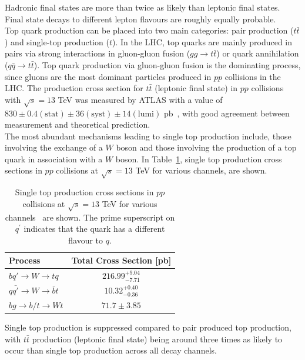 \noindent
Hadronic final states are more than twice as likely than leptonic final states. Final state decays to different lepton flavours are roughly equally probable.\\
Top quark production can be placed into two main categories: pair production ($t\bar{t}$) and single-top production ($t$). In the LHC, top quarks are mainly produced in pairs via strong interactions in gluon-gluon fusion ($gg\rightarrow t\bar{t}$) or quark annihilation ($q\bar{q}\rightarrow t\bar{t}$). Top quark production via gluon-gluon fusion is the dominating process, since gluons are the most dominant particles produced in $pp$ collisions in the LHC. The production cross section for $t\bar{t}$ (leptonic final state) in $pp$ collisions with $\sqrt{s} = 13$ TeV was measured by ATLAS with a value of $830 \pm 0.4 (\text{stat}) \pm 36 (\text{syst}) \pm 14 (\text{lumi})$ pb~\cite{ATLAS-tt-crossSection-2020}, with good agreement between measurement and theoretical prediction.\\

\noindent
The most abundant mechanisms leading to single top production include, those involving the exchange of a $W$ boson and those involving the production of a top quark in association with a $W$ boson. In Table~\ref{tab:single-top-crossSection}, single top production cross sections in $pp$ collisions at $\sqrt{s}=13$ TeV for various channels, are shown.


\begin{table}[h!]
\def\arraystretch{1.5}%
\begin{tabular}{l|c}
\hline
Process & Total Cross Section [pb] \\ \hline
$bq'\rightarrow W \rightarrow tq$ &  $216.99^{+9.04}_{-7.71}$\\
 $q\bar{q'}\rightarrow   W \rightarrow \bar{b}t$& $10.32^{+0.40}_{-0.36}$  \\
$bg \rightarrow  b/t \rightarrow Wt$ &  $71.7\pm 3.85$\\ \hline
\end{tabular}
\centering
\caption{Single top production cross sections in $pp$ collisions at $\sqrt{s}=13$ TeV for various channels~\cite{summaryPlots} are shown. The prime superscript on $q^{'}$ indicates that the quark has a different flavour to $q$. }
\label{tab:single-top-crossSection}
\end{table}
\noindent
Single top production is suppressed compared to pair produced top production, with $t\bar{t}$ production (leptonic final state) being around three times as likely to occur than single top production across all decay channels.

